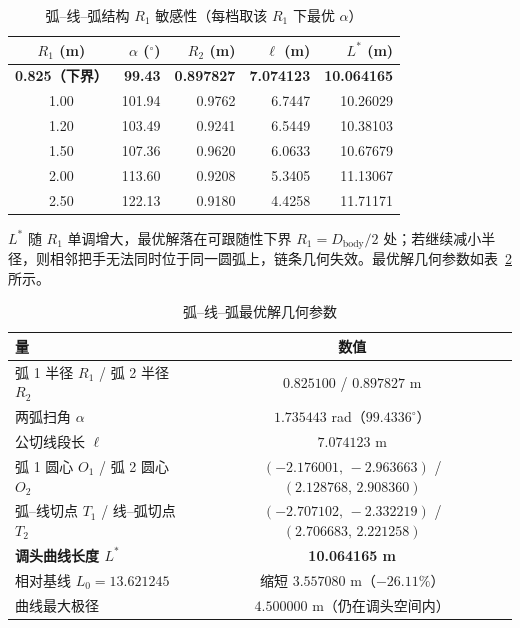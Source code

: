 ﻿\documentclass{cumcmthesis}
\begin{document}
\begin{table}[H]
\centering
\caption{弧–线–弧结构 $R_1$ 敏感性（每档取该 $R_1$ 下最优 $\alpha$）}
\label{tab:q4sens}
\footnotesize\setlength{\tabcolsep}{5pt}
\renewcommand{\arraystretch}{1.12}
\begin{tabular}{crrrr}
\toprule
$R_1$ (m) & $\alpha$ ($^\circ$) & $R_2$ (m) & $\ell$ (m) & $L^{*}$ (m) \\
\midrule
\textbf{0.825（下界）} & \textbf{99.43} & \textbf{0.897827} & \textbf{7.074123} & \textbf{10.064165} \\
1.00 & 101.94 & 0.9762 & 6.7447 & 10.26029 \\
1.20 & 103.49 & 0.9241 & 6.5449 & 10.38103 \\
1.50 & 107.36 & 0.9620 & 6.0633 & 10.67679 \\
2.00 & 113.60 & 0.9208 & 5.3405 & 11.13067 \\
2.50 & 122.13 & 0.9180 & 4.4258 & 11.71171 \\
\bottomrule
\end{tabular}
\end{table}

$L^{*}$ 随 $R_1$ 单调增大，最优解落在可跟随性下界 $R_1=D_{\text{body}}/2$ 处；若继续减小半径，则相邻把手无法同时位于同一圆弧上，链条几何失效。最优解几何参数如表~\ref{tab:q4opt} 所示。

\begin{table}[H]
\centering
\caption{弧–线–弧最优解几何参数}
\label{tab:q4opt}
\footnotesize
\begin{tabular}{lc}
\toprule
量 & 数值 \\
\midrule
弧 1 半径 $R_1$ / 弧 2 半径 $R_2$ & $0.825100$ / $0.897827$ m \\
两弧扫角 $\alpha$ & $1.735443$ rad（$99.4336^\circ$） \\
公切线段长 $\ell$ & $7.074123$ m \\
弧 1 圆心 $O_1$ / 弧 2 圆心 $O_2$ & $(-2.176001,\,-2.963663)$ / $(2.128768,\,2.908360)$ \\
弧–线切点 $T_1$ / 线–弧切点 $T_2$ & $(-2.707102,\,-2.332219)$ / $(2.706683,\,2.221258)$ \\
\textbf{调头曲线长度 $L^{*}$} & \textbf{10.064165 m} \\
相对基线 $L_0=13.621245$ & 缩短 $3.557080$ m（$-26.11\%$） \\
曲线最大极径 & $4.500000$ m（仍在调头空间内） \\
\bottomrule
\end{tabular}
\end{table}
\end{document}
